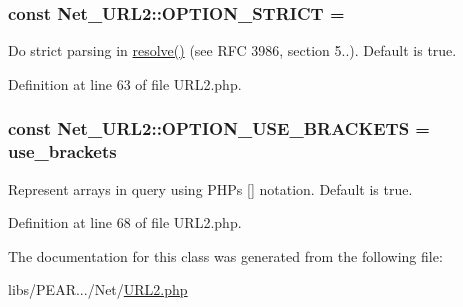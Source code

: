 \subsubsection[{\texorpdfstring{O\+P\+T\+I\+O\+N\+\_\+\+S\+T\+R\+I\+CT}{OPTION_STRICT}}]{\setlength{\rightskip}{0pt plus 5cm}const Net\+\_\+\+U\+R\+L2\+::\+O\+P\+T\+I\+O\+N\+\_\+\+S\+T\+R\+I\+CT = \textquotesingle{}}\hypertarget{classNet__URL2_a766955033bdccec7175d0694df62a1a9}{}\label{classNet__URL2_a766955033bdccec7175d0694df62a1a9}
Do strict parsing in \hyperlink{classNet__URL2_a8630ab79fad624b2fd5b0df2e9123c0a}{resolve()} (see R\+FC 3986, section 5..). Default is true. 

Definition at line 63 of file U\+R\+L2.\+php.

\subsubsection[{\texorpdfstring{O\+P\+T\+I\+O\+N\+\_\+\+U\+S\+E\+\_\+\+B\+R\+A\+C\+K\+E\+TS}{OPTION_USE_BRACKETS}}]{\setlength{\rightskip}{0pt plus 5cm}const Net\+\_\+\+U\+R\+L2\+::\+O\+P\+T\+I\+O\+N\+\_\+\+U\+S\+E\+\_\+\+B\+R\+A\+C\+K\+E\+TS = \textquotesingle{}use\+\_\+brackets\textquotesingle{}}\hypertarget{classNet__URL2_a864182f067e5df22055afc3a0dfe5a57}{}\label{classNet__URL2_a864182f067e5df22055afc3a0dfe5a57}
Represent arrays in query using P\+HP\textquotesingle{}s \mbox{[}\mbox{]} notation. Default is true. 

Definition at line 68 of file U\+R\+L2.\+php.



The documentation for this class was generated from the following file\+:\begin{DoxyCompactItemize}
\item 
libs/\+P\+E\+A\+R.../\+Net/\hyperlink{URL2_8php}{U\+R\+L2.\+php}\end{DoxyCompactItemize}
